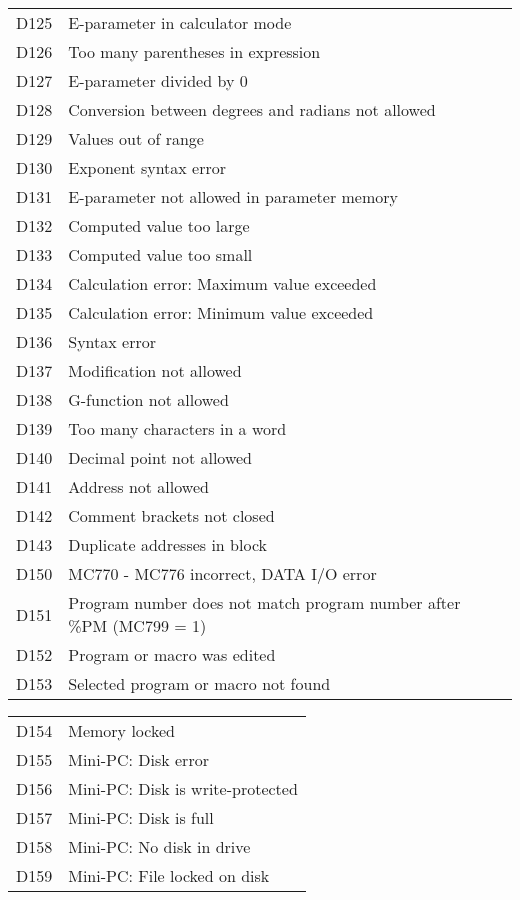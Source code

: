 \documentclass[openany,11pt]{book}
\begin{document}
\begin{table}[!h]
\begin{tabular}{ll}
    D125 & E-parameter in calculator mode \\
    D126 & Too many parentheses in expression \\
    D127 & E-parameter divided by 0 \\
    D128 & Conversion between degrees and radians not allowed \\
    D129 & Values out of range \\
    D130 & Exponent syntax error \\
    D131 & E-parameter not allowed in parameter memory \\
    D132 & Computed value too large \\
    D133 & Computed value too small \\
    D134 & Calculation error: Maximum value exceeded \\
    D135 & Calculation error: Minimum value exceeded \\
    D136 & Syntax error \\
    D137 & Modification not allowed \\
    D138 & G-function not allowed \\
    D139 & Too many characters in a word \\
    D140 & Decimal point not allowed \\
    D141 & Address not allowed \\
    D142 & Comment brackets not closed \\
    D143 & Duplicate addresses in block \\
    D150 & MC770 - MC776 incorrect, DATA I/O error \\
    D151 & Program number does not match program number after \%PM (MC799 = 1) \\
    D152 & Program or macro was edited \\
    D153 & Selected program or macro not found \\
    \end{tabular}
\end{table}

\newpage

\begin{table}[!h]
    \begin{tabular}{ll}
    D154 & Memory locked \\
    D155 & Mini-PC: Disk error \\ 
    D156 & Mini-PC: Disk is write-protected \\
    D157 & Mini-PC: Disk is full \\ 
    D158 & Mini-PC: No disk in drive \\
    D159 & Mini-PC: File locked on disk \\
    \end{tabular}
\end{table}
\end{document}
